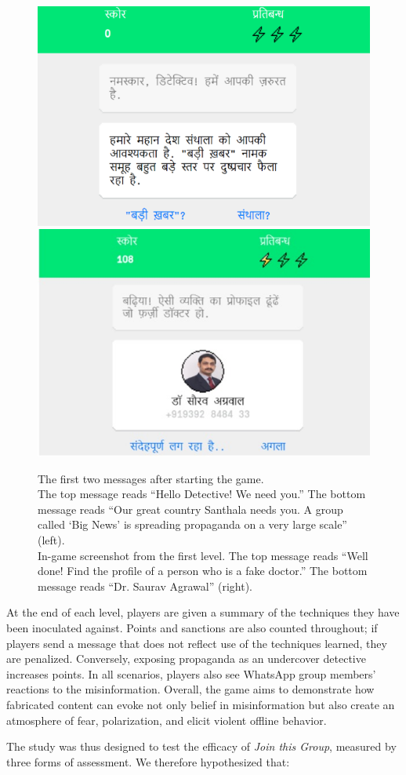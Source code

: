 \documentclass[empirical, authordate, issue]{jote-new-article}
\begin{document}
\begin{figure}[t]

  \begin{fullwidth}
    \centering
    \includegraphics[height=.3\linewidth]{media/image3a.jpeg}
    \includegraphics[height=.3\linewidth]{media/image3b.jpg}
    \caption{The first two messages after starting the game. \\The top message reads “Hello Detective! We need you.” The bottom message reads “Our great country Santhala needs you. A group called ‘Big News' is spreading propaganda on a very large scale” (left). \\In-game screenshot from the first level. The top message reads “Well done! Find the profile of a person who is a fake doctor.” The bottom message reads “Dr. Saurav Agrawal” (right).}
    \label{fig:figure3}
  \end{fullwidth}
\end{figure}



At the end of each level, players are given a summary of the techniques they have been inoculated against. Points and sanctions are also counted throughout; if players send a message that does not reflect use of the techniques learned, they are penalized. Conversely, exposing propaganda as an undercover detective increases points. In all scenarios, players also see \mbox{WhatsApp} group members' reactions to the misinformation. Overall, the game aims to demonstrate how fabricated content can evoke not only belief in misinformation but also create an atmosphere of fear, polarization, and elicit violent offline behavior.

The study was thus designed to test the efficacy of \emph{Join this Group}, measured by three forms of assessment. We therefore hypothesized that:
\end{document}
